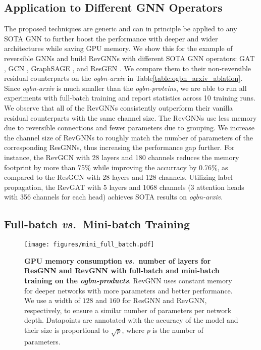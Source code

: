 \documentclass{article}
\newcommand{\vs}{\emph{vs.~}}
\newcommand{\tblLabel}{Table\xspace}
\begin{document}
\subsection{Application to Different GNN Operators}
The proposed techniques are generic and can in principle be applied to any SOTA GNN to further boost the performance with deeper and wider architectures while saving GPU memory. We show this for the example of reversible GNNs and build RevGNNs with different SOTA GNN operators: GAT \citep{veli2018gat}, GCN \citep{kipf2017semi}, GraphSAGE \citep{hamilton2017inductive}, and ResGEN \citep{li2020deepergcn}. We compare them to their non-reversible residual counterparts on the \emph{ogbn-arxiv} in \tblLabel \ref{table:ogbn_arxiv_ablation}. Since \emph{ogbn-arxiv} is much smaller than the \emph{ogbn-proteins}, we are able to run all experiments with full-batch training and report statistics across 10 training runs. We observe that all of the RevGNNs consistently outperform their vanilla residual counterparts with the same channel size. The RevGNNs use less memory due to reversible connections and fewer parameters due to grouping. We increase the channel size of RevGNNs to roughly match the number of parameters of the corresponding ResGNNs, thus increasing the performance gap further. For instance, the RevGCN with 28 layers and 180 channels reduces the memory footprint by more than 75\% while improving the accurracy by 0.76\%, as compared to the ResGCN with 28 layers and 128 channels. Utilizing label propagation, the RevGAT with 5 layers and 1068 channels (3 attention heads with 356 channels for each head) achieves SOTA results on \emph{ogbn-arxiv}.

\subsection{Full-batch \vs Mini-batch Training}

\begin{figure}[!t]
    \centering
    \texttt{[image: figures/mini\_full\_batch.pdf]}
    \caption{\textbf{GPU memory consumption \vs number of layers for ResGNN \citep{li2020deepergcn} and RevGNN with full-batch and mini-batch training on the \emph{ogbn-products}}. RevGNN uses constant memory for deeper networks with more parameters and better performance. We use a width of $128$ and $160$ for ResGNN and RevGNN, respectively,  to ensure a similar number of parameters per network depth. Datapoints are annotated with the accuracy of the model and their size is proportional to $\sqrt{p}$, where $p$ is the number of parameters.}
    \vspace{-11pt}
    \label{fig:mini_full_batch}
\end{figure}
\end{document}
